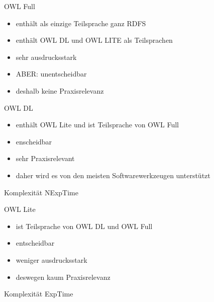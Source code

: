 \documentclass{beamer}
\begin{document}
%
\begin{frame}{OWL Full}
\begin{itemize}
	\item enthält als einzige Teilsprache \alert{ganz} RDFS
	\item enthält OWL DL und OWL LITE als Teilsprachen
	\item sehr ausdrucksstark
	\item ABER: \alert{unentscheidbar}
	\item deshalb keine Praxisrelevanz
\end{itemize}
\end{frame}

%
\begin{frame}{OWL DL}
\begin{itemize}
	\item enthält OWL Lite und ist Teilsprache von OWL Full
	\item enscheidbar
	\item sehr Praxisrelevant
	\item daher wird es von den meisten Softwarewerkzeugen unterstützt
\end{itemize}
\begin{block}{Komplexität}
	NExpTime
\end{block}
\end{frame}

%
\begin{frame}{OWL Lite}
\begin{itemize}
	\item ist Teilsprache von OWL DL und OWL Full
	\item entscheidbar
	\item weniger ausdrucksstark
	\item deswegen kaum Praxisrelevanz
\end{itemize}
\begin{block}{Komplexität}
	ExpTime
\end{block}
\end{frame}



\end{document}
